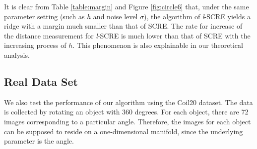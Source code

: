 \documentclass[aos,preprint]{imsart}
\theoremstyle{remark}
\begin{document}
\begin{table}[h]
\caption{The Margin and Hausdorff between $\cal \hat{G}$, ${\cal \hat{G}}_{\ell}$ and $\mathcal M$ Varies with $h$ for SCRE and {\it l}-SCRE}
\label{table:margin}
\end{table}

It is clear from Table \ref{table:margin} and Figure \ref{fig:circle6} that, under the same parameter setting (such as $h$ and noise level $\sigma$), the algorithm of {\it l}-SCRE yields a ridge with a margin much smaller than that of SCRE. The rate for increase of the distance measurement for {\it l}-SCRE is much lower than that of SCRE with the increasing process of $h$. This phenomenon is also explainable in our theoretical analysis.

\subsection{Real Data Set}
We also test the performance of our algorithm using the Coil20 \cite{Coil20} dataset. The data is collected by rotating an object with 360 degrees. For each object, there are 72 images corresponding to a particular angle. Therefore, the images for each object can be supposed to reside on a one-dimensional manifold, since the underlying parameter is the angle.
\end{document}
